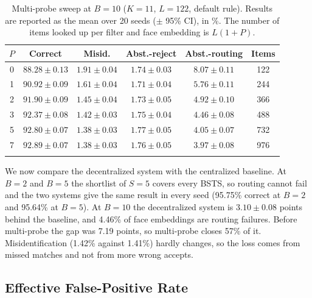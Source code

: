 \documentclass[pdflatex,sn-mathphys-num]{sn-jnl}%
\theoremstyle{thmstyleone}%
\theoremstyle{thmstyletwo}%
\theoremstyle{thmstylethree}%
\begin{document}
\begin{table}[!t]
\caption{Multi-probe sweep at $B=10$ ($K=11$, $L=122$, default rule).
Results are reported as the mean over 20 seeds ($\pm$ 95\% CI), in \%.
The number of items looked up per filter and face embedding is $L(1+P)$.}
\label{tab:probe}

\begin{tabular*}{\textwidth}
{@{\extracolsep\fill}cccccc}
\toprule
$P$
& Correct & Misid. & Abst.-reject & Abst.-routing & Items \\
\midrule

0 & $88.28 \pm 0.13$ & $1.91 \pm 0.04$ & $1.74 \pm 0.03$ & $8.07 \pm 0.11$ & 122 \\

1 & $90.92 \pm 0.09$ & $1.61 \pm 0.04$ & $1.71 \pm 0.04$ & $5.76 \pm 0.11$ & 244 \\

2 & $91.90 \pm 0.09$ & $1.45 \pm 0.04$ & $1.73 \pm 0.05$ & $4.92 \pm 0.10$ & 366 \\

3 & $92.37 \pm 0.08$ & $1.42 \pm 0.03$ & $1.75 \pm 0.04$ & $4.46 \pm 0.08$ & 488 \\

5 & $92.80 \pm 0.07$ & $1.38 \pm 0.03$ & $1.77 \pm 0.05$ & $4.05 \pm 0.07$ & 732 \\

7 & $92.89 \pm 0.07$ & $1.38 \pm 0.03$ & $1.76 \pm 0.05$ & $3.97 \pm 0.08$ & 976 \\
\botrule
\end{tabular*}

\end{table}

\noindent We now compare the decentralized system with the centralized baseline. At $B=2$ and $B=5$ the shortlist of
$S=5$ covers every BSTS, so routing cannot fail and the two systems give the same result in every seed
(95.75\% correct at $B=2$ and 95.64\% at $B=5$). At $B=10$ the decentralized system is $3.10 \pm 0.08$ points behind the
baseline, and 4.46\% of face embeddings are routing failures. Before multi-probe the gap was 7.19 points, so
multi-probe closes 57\% of it. Misidentification (1.42\% against 1.41\%) hardly changes, so the
loss comes from missed matches and not from more wrong accepts.

\subsection{Effective False-Positive Rate}
\label{sec:fpr}
\end{document}
